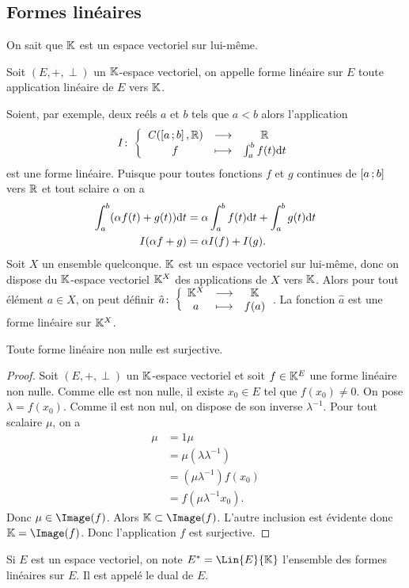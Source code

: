 \subsection{Formes linéaires}
On sait que $\mathbb{K}$ est un espace vectoriel sur lui-même.
\begin{defdef}
  Soit $(E,+,\perp)$ un $\mathbb{K}$-espace vectoriel, on appelle forme linéaire sur $E$ toute application linéaire de $E$ vers $\mathbb{K}$.
\end{defdef}

Soient, par exemple, deux reéls $a$ et $b$ tels que $a<b$ alors l'application
\begin{equation}
 I\colon \left\{\begin{array}{ccc} \mathit{C}(\left[ a \, ;  b \right],\mathbb{R}) & \longrightarrow &\mathbb{R}\\ f & \longmapsto & \int_{a}^b f(t)\mathrm{d} t \end{array} \right. 
\end{equation}
est une forme linéaire. Puisque pour toutes fonctions $f$ et $g$ continues de $\left[ a \, ;  b \right]$ vers $\mathbb{R}$ et tout sclaire $\alpha$ on a
\begin{align}
  \int_{a}^b (\alpha f(t)+g(t))\mathrm{d} t &= \alpha \int_{a}^b f(t)\mathrm{d} t + \int_{a}^b g(t)\mathrm{d} t \\
  I(\alpha f+g)&=\alpha I(f)+I(g).
\end{align}
Soit $X$ un ensemble quelconque. $\mathbb{K}$ est un espace vectoriel sur lui-même, donc on dispose du $\mathbb{K}$-espace vectoriel $\mathbb{K}^X$ des applications de $X$ vers $\mathbb{K}$. Alors pour tout élément $a \in X$, on peut définir $\hat{a}\colon \left\{\begin{array}{ccc} \mathbb{K}^X & \longrightarrow &\mathbb{K}\\ a & \longmapsto & f(a) \end{array} \right.$. La fonction $\hat{a}$ est une forme linéaire sur $\mathbb{K}^X$.
\begin{theo}
  Toute forme linéaire non nulle est surjective.
\end{theo}
\begin{proof}
  Soit $(E,+,\perp)$ un $\mathbb{K}$-espace vectoriel et soit $f \in \mathbb{K}^E$ une forme linéaire non nulle. Comme elle est non nulle, il existe $x_0 \in E$ tel que $f(x_0)\neq 0$. On pose $\lambda =f(x_0)$. Comme il est non nul, on dispose de son inverse $\lambda^{-1}$. Pour tout scalaire $\mu$, on a
  \begin{align}
    \mu & =1 \mu \\
    &= \mu (\lambda \lambda^{-1})\\
    &=(\mu\lambda^{-1})f(x_0)\\
    &=f(\mu\lambda^{-1}x_0).
  \end{align}
  Donc $\mu \in \Image(f)$. Alors $\K \subset \Image(f)$. L'autre inclusion est évidente donc $\K=\Image(f)$. Donc l'application $f$ est surjective.
\end{proof}

Si $E$ est un espace vectoriel, on note $E^*=\Lin{E}{\K}$ l'ensemble des formes linéaires sur $E$. Il est appelé le dual de $E$.

